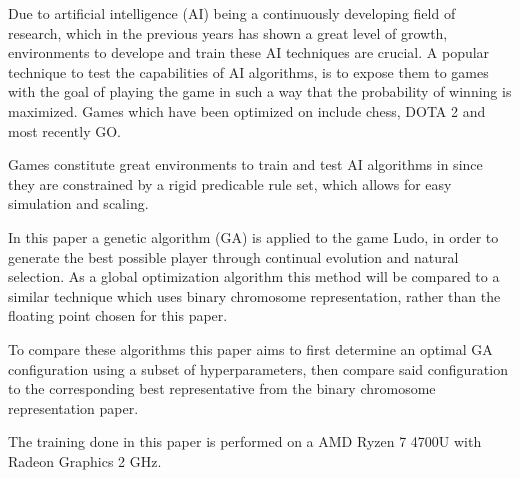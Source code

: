 
Due to artificial intelligence (AI) being a continuously developing field of research, which in the previous years 
has shown a great level of growth, environments to develope and train these AI techniques are crucial.
A popular technique to test the capabilities of AI algorithms, is to 
expose them to games with the goal of playing the game in such a way that the probability of 
winning is maximized. Games which have been optimized on include chess\cite{CAMPBELL200257}, DOTA 2\cite{SilverHuangEtAl16nature}
and most recently GO\cite{openai2019dota}. \par
Games constitute great environments to train and test AI algorithms in since they are
constrained by a rigid predicable rule set, which allows for easy simulation and scaling. \par
In this paper a genetic algorithm (GA) is applied to the game Ludo, in order to generate 
the best possible player through continual evolution and natural selection. 
As a global optimization algorithm this method will be compared to a similar technique which uses 
binary chromosome representation\cite{peter}, rather than the floating point chosen for this paper. \par
To compare these algorithms this paper aims to first determine an optimal GA configuration using a subset 
of hyperparameters, then compare said configuration to the corresponding best representative from the binary 
chromosome representation paper\cite{peter}.\par
The training done in this paper is performed on a AMD Ryzen 7 4700U with Radeon Graphics 2 GHz.


